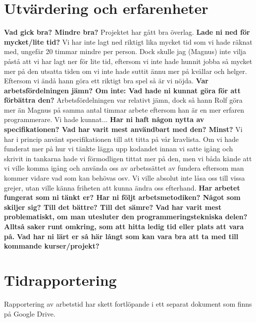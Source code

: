 \documentclass{scrartcl}
\begin{document}
\section{Utvärdering och erfarenheter}


\textbf{Vad gick bra? Mindre bra?}
Projektet har gått bra överlag. 
\textbf{Lade ni ned för mycket/lite tid?}
Vi har inte lagt ned riktigt lika mycket tid som vi hade räknat med, ungefär 20 timmar mindre per person. Dock skulle jag (Magnus) inte vilja påstå att vi har lagt ner för lite tid, eftersom vi inte hade hunnit jobba så mycket mer på den utsatta tiden om vi inte hade suttit ännu mer på kvällar och helger. Eftersom vi ändå hann göra ett riktigt bra spel så är vi nöjda. 
\textbf{Var arbetsfördelningen jämn? Om inte: Vad hade ni kunnat göra för att förbättra den?}
Arbetsfördelningen var relativt jämn, dock så hann Rolf göra mer än Magnus på samma antal timmar arbete eftersom han är en mer erfaren programmerare. Vi hade kunnat...
\textbf{Har ni haft någon nytta av specifikationen? Vad har varit mest användbart med den? Minst?}
Vi har i princip använt specifikationen till att titta på vår kravlista. Om vi hade funderat mer på hur vi tänkte lägga upp kodandet innan vi satte igång och skrivit in tankarna hade vi förmodligen tittat mer på den, men vi båda kände att vi ville komma igång och använda oss av arbetssättet av fundera eftersom man kommer vidare vad som kan behövas osv. Vi ville absolut inte låsa oss till vissa grejer, utan ville känna friheten att kunna ändra oss efterhand. 
\textbf{Har arbetet fungerat som ni tänkt er? Har ni följt arbetsmetodiken? Något som skiljer sig? Till det bättre? Till det sämre?}
\textbf{Vad har varit mest problematiskt, om man utesluter den programmeringstekniska delen? Alltså saker runt omkring, som att hitta ledig tid eller plats att vara på.}
\textbf{Vad har ni lärt er så här långt som kan vara bra att ta med till kommande kurser/projekt?}

\section{Tidrapportering}
Rapportering av arbetstid har skett fortlöpande i ett separat dokument som finns på Google Drive.
\end{document}

